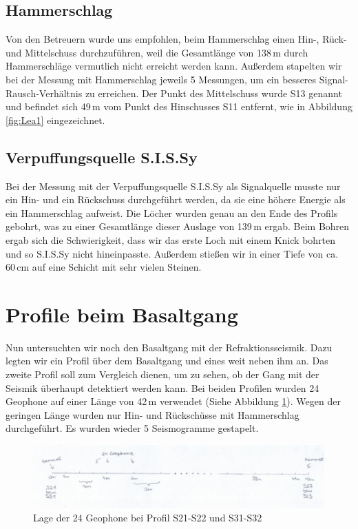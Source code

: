 \subsection{Hammerschlag}

Von den Betreuern wurde uns empfohlen, beim Hammerschlag einen Hin-, Rück- und Mittelschuss durchzuführen, weil die Gesamtlänge von 138\,m durch Hammerschläge vermutlich nicht erreicht werden kann. Außerdem stapelten wir bei der Messung mit Hammerschlag jeweils 5 Messungen, um ein besseres Signal-Rausch-Verhältnis zu erreichen. Der Punkt des Mittelschuss wurde S13 genannt und befindet sich 49\,m vom Punkt des Hinschusses S11 entfernt, wie in Abbildung \ref{fig:Lea1} eingezeichnet.

\subsection{Verpuffungsquelle S.I.S.Sy}

Bei der Messung mit der Verpuffungsquelle S.I.S.Sy als  Signalquelle musste nur ein Hin- und ein Rückschuss durchgeführt werden, da sie eine höhere Energie als ein Hammerschlag aufweist. Die Löcher wurden genau an den Ende des Profils gebohrt, was zu einer Gesamtlänge dieser Auslage von 139\,m ergab. Beim Bohren ergab sich die Schwierigkeit, dass wir das erste Loch mit einem Knick bohrten und so S.I.S.Sy nicht hineinpasste. Außerdem stießen wir in einer Tiefe von ca. 60\,cm auf eine Schicht mit sehr vielen Steinen.

\section{Profile beim Basaltgang}

Nun untersuchten wir noch den Basaltgang mit der Refraktionsseismik. Dazu legten wir ein Profil über dem Basaltgang und eines weit neben ihm an. Das zweite Profil soll zum Vergleich dienen, um zu sehen, ob der Gang mit der Seismik überhaupt detektiert werden kann. Bei beiden Profilen wurden 24 Geophone auf einer Länge von 42\,m verwendet (Siehe Abbildung \ref{fig:Lea2}). Wegen der geringen Länge wurden nur Hin- und Rückschüsse mit Hammerschlag durchgeführt. Es wurden wieder 5 Seismogramme gestapelt.

\begin{figure}[!ht]
 \centering
 \includegraphics[width=\textwidth]{fig/Skizze2}
 \caption{Lage der 24 Geophone bei Profil S21-S22 und S31-S32}
 \label{fig:Lea2}
\end{figure}

